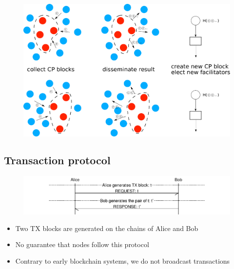 \documentclass{beamer}
\begin{document}
\begin{frame}{\subsecname}
  \begin{figure}
    \includegraphics[width=1.0\textwidth]{consensus-overview}
    \centering
  \end{figure}
\end{frame}

\subsection{Transaction protocol}
\begin{frame}{\subsecname}
  \begin{figure}[h]
  \includegraphics[width=1.0\textwidth]{tx-proto}
  \centering
  \end{figure}
\begin{itemize}
\item Two TX blocks are generated on the chains of Alice and Bob
\item No guarantee that nodes follow this protocol
\item Contrary to early blockchain systems, we do not broadcast transactions
\end{itemize}
\end{frame}
\end{document}
